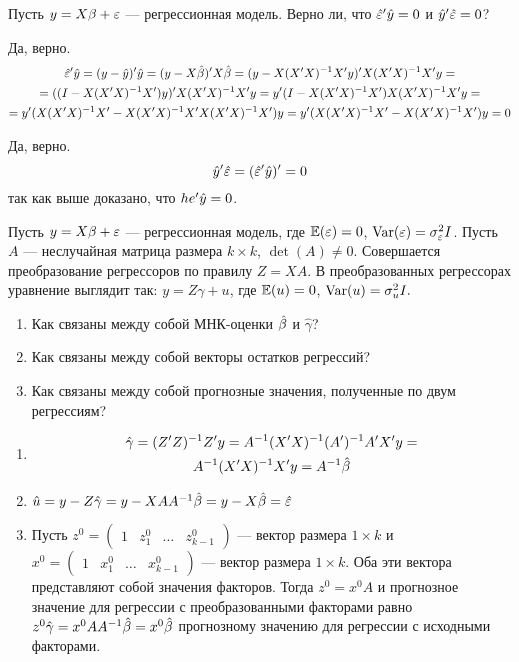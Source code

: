 \begin{problem}
Пусть $y = X\beta + \varepsilon$ --- регрессионная модель. Верно ли, что $\hat{\varepsilon}'\hat{y}=0$ и $\hat{y}'\hat{\varepsilon}=0$?
\end{problem}
\begin{solution}
Да, верно.
\begin{multline*}
\hat{\varepsilon}'\hat{y}=(y-\hat{y})'\hat{y}=(y-X\hat\beta)'X\hat\beta=(y-X(X'X)^{-1}X'y)'X(X'X)^{-1}X'y=\\=
((I-X(X'X)^{-1}X')y)'X(X'X)^{-1}X'y=y'(I-X(X'X)^{-1}X')X(X'X)^{-1}X'y=\\
=y'(X(X'X)^{-1}X'-X(X'X)^{-1}X'X(X'X)^{-1}X')y=y'(X(X'X)^{-1}X'-X(X'X)^{-1}X')y=0
\end{multline*}

Да, верно.
\[\hat{y}'\hat{\varepsilon}=(\hat{\varepsilon}'\hat{y})'=0\]
так как выше доказано, что $he'\hat{y}=0$.
\end{solution}

\begin{problem}
Пусть $y = X\beta + \varepsilon$ --- регрессионная модель, где $\mathbb{E}(\varepsilon)=0$, $\operatorname{Var}(\varepsilon)=\sigma_{\varepsilon}^2 I$. Пусть $A$ --- неслучайная матрица размера $k \times k$, $\det(A) \not= 0.$ Совершается преобразование регрессоров по правилу $Z=XA$. В преобразованных регрессорах уравнение выглядит так: $y = Z\gamma + u$, где $\mathbb{E}(u)=0$, $\operatorname{Var}(u)=\sigma_{u}^2 I.$

\begin{enumerate}
\item Как связаны между собой МНК-оценки $\hat{\beta}$ и $\hat{\gamma}$?
\item Как связаны между собой векторы остатков регрессий?
\item Как связаны между собой прогнозные значения, полученные по двум регрессиям?
\end{enumerate}
\end{problem}

\begin{solution}
\begin{enumerate}
\item 
\begin{multline}
\hat{\gamma} = (Z'Z)^{-1}Z'y = A^{-1}(X'X)^{-1}(A')^{-1}A'X'y =\\
 A^{-1}(X'X)^{-1} X'y = A^{-1}\hat{\beta}
\end{multline}
\item $\hat{u} = y - Z\hat{\gamma} = y - XAA^{-1}\hat{\beta} = y - X\hat{\beta} = \hat{\varepsilon}$
\item Пусть $z^0 = \begin{pmatrix} 1 & z_1^0 & \dots & z_{k-1}^0 \end{pmatrix}$ --- вектор размера $1 \times k$ и $x^0 = \begin{pmatrix} 1 & x_1^0 & \dots & x_{k-1}^0 \end{pmatrix}$ --- вектор размера $1 \times k$. Оба эти вектора представляют собой значения факторов. Тогда $z^0 = x^0 A$ и прогнозное значение для регрессии с преобразованными факторами равно $z^0 \hat{\gamma} = x^0 AA^{-1} \hat{\beta} = x^0 \hat{\beta}$ прогнозному значению для регрессии с исходными факторами. 
\end{enumerate}
\end{solution}


